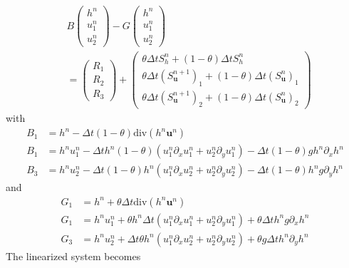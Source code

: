 \documentclass[a4paper, 11pt]{article}
\begin{document}
\begin{equation*}
\begin{split}
&B\begin{pmatrix}h^n\\u_1^n\\u_2^n\end{pmatrix}-G\begin{pmatrix}h^{n}\\u_1^{n}\\u_2^{n}\end{pmatrix}\\
&=\begin{pmatrix} R_{1}\\
 R_{2}\\
 R_{3}\end{pmatrix}
 +\begin{pmatrix}\theta \Delta tS_h^n+(1-\theta)\Delta tS_h^{n}\\ \theta \Delta t\left(S_{\boldsymbol{u}}^{n+1}\right)_1+(1-\theta)\Delta t\left(S_{\boldsymbol{u}}^n\right)_1\\ \theta \Delta t\left(S_{\boldsymbol{u}}^{n+1}\right)_2+(1-\theta)\Delta t\left(S_{\boldsymbol{u}}^n\right)_2\end{pmatrix}
\end{split}
\end{equation*}
with
\begin{align*}
B_{1} &= h^n-\Delta t(1-\theta)\text{div}(h^n\boldsymbol{u}^n)\\
B_{1} & = h^nu_1^n-\Delta th^n(1-\theta)(u_1^n\partial_xu_1^n+u_2^n\partial_yu_1^n)-\Delta t(1-\theta)gh^n\partial_xh^n\\
B_{3} & = h^nu_2^n-\Delta t(1-\theta)h^n(u_1^n\partial_xu_2^n+u_2^n\partial_yu_2^n)-\Delta t(1-\theta)h^ng\partial_yh^n
\end{align*}
and
\begin{align*}
G_{1} &= h^n+\theta\Delta t\text{div}(h^n\boldsymbol{u}^n) \\
G_{1} & = h^nu_1^n+\theta h^n\Delta t(u_1^n\partial_xu_1^n+u_2^n\partial_yu_1^n)+\theta\Delta th^ng\partial_xh^n\\
G_{3} & = h^nu_2^n+\Delta t\theta h^n(u_1^n\partial_xu_2^n+u_2^n\partial_yu_2^n)+\theta g\Delta th^n\partial_yh^n
\end{align*}
The linearized system becomes
\end{document}
